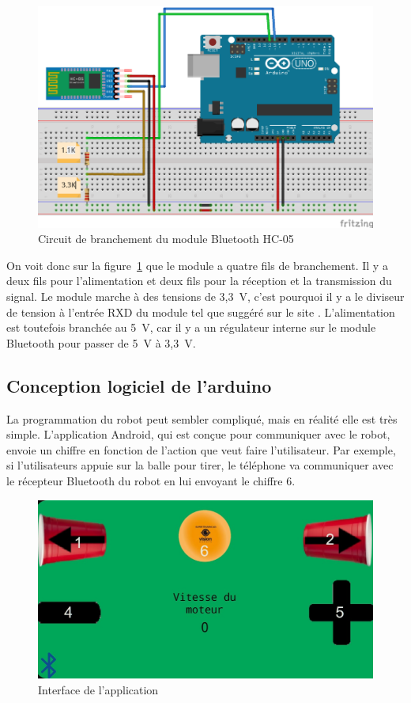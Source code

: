 \begin{figure}[h!]
    \centering
    \includegraphics[width=0.4\linewidth]{img/s2/elec/CircuitHC-05}
    \caption{Circuit de branchement du module Bluetooth HC-05}
    \label{fig:s2-elec-CircuitHC-05}
\end{figure}

On voit donc sur la figure~\ref{fig:s2-elec-CircuitHC-05} que le module a quatre fils de branchement.
Il y a deux fils pour l’alimentation et deux fils pour la réception et la transmission du signal.
Le module marche à des tensions de 3,3~V, c’est pourquoi il y a le diviseur de tension à l’entrée RXD du module tel que suggéré sur le site \cite{explore_embedded_setting_nodate}.
L’alimentation est toutefois branchée au 5~V, car il y a un régulateur interne sur le module Bluetooth pour passer de 5~V à 3,3~V.

\subsection{Conception logiciel de l'arduino}

La programmation du robot peut sembler compliqué, mais en réalité elle est très simple.
L’application Android, qui est conçue pour communiquer avec le robot, envoie un chiffre en fonction de l’action que veut faire l’utilisateur.
Par exemple, si l’utilisateurs appuie sur la balle pour tirer, le téléphone va communiquer avec le récepteur Bluetooth du robot en lui envoyant le chiffre 6.

\begin{figure}[h!]
    \centering
    \includegraphics[width=\linewidth]{img/s2/code/application-screen}
    \caption{Interface de l'application}
    \label{fig:s2-code-application-screen}
\end{figure}

